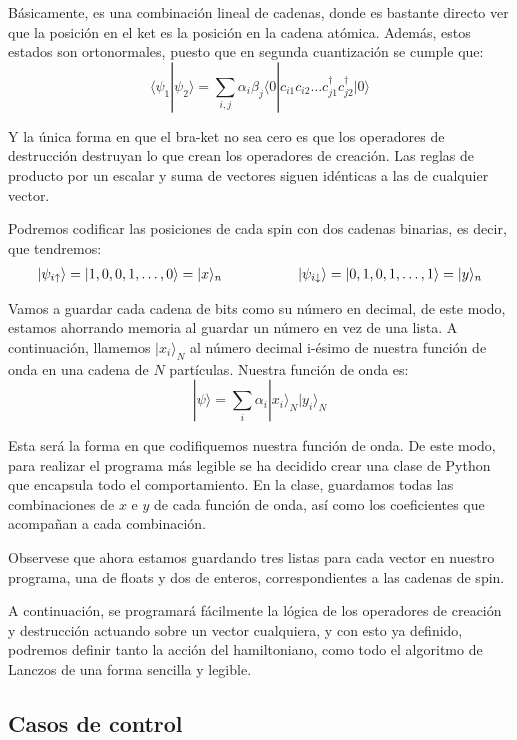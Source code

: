 \documentclass[12pt,twoside]{article}
\begin{document}
Básicamente, es una combinación lineal de cadenas, donde es bastante directo ver que la posición en el ket es la posición en la cadena atómica. Además, estos estados son ortonormales, puesto que en segunda cuantización se cumple que:
$$
\langle\psi_1|\psi_2\rangle = \sum_{i, j}\alpha_i\beta_j\langle 0| c_{i1}c_{i2}\ldots c_{j1}^{\dagger}c_{j2}^{\dagger}|0\rangle
$$

Y la única forma en que el bra-ket no sea cero es que los operadores de destrucción destruyan lo que crean los operadores de creación. Las reglas de producto por un escalar y suma de vectores siguen idénticas a las de cualquier vector.

Podremos codificar las posiciones de cada spin con dos cadenas binarias, es decir, que tendremos:
$$
\begin{array}{ccc}
  |\psi_{i\uparrow}\rangle = |1, 0, 0, 1, \ldots, 0\rangle = |x\rangle_n & \hspace{0.1\linewidth} & |\psi_{i\downarrow}\rangle = |0, 1, 0, 1, \ldots, 1\rangle = |y\rangle_n
\end{array}
$$

Vamos a guardar cada cadena de bits como su número en decimal, de este modo, estamos ahorrando memoria al guardar un número en vez de una lista. A continuación, llamemos $|x_i\rangle_N$ al número decimal i-ésimo de nuestra función de onda en una cadena de $N$ partículas. Nuestra función de onda es:
$$
|\psi\rangle = \sum_i\alpha_i|x_i\rangle_N|y_i\rangle_N
$$

Esta será la forma en que codifiquemos nuestra función de onda. De este modo, para realizar el programa más legible se ha decidido crear una clase de Python que encapsula todo el comportamiento. En la clase, guardamos todas las combinaciones de $x$ e $y$ de cada función de onda, así como los coeficientes que acompañan a cada combinación.

Observese que ahora estamos guardando tres listas para cada vector en nuestro programa, una de floats y dos de enteros, correspondientes a las cadenas de spin.

A continuación, se programará fácilmente la lógica de los operadores de creación y destrucción actuando sobre un vector cualquiera, y con esto ya definido, podremos definir tanto la acción del hamiltoniano, como todo el algoritmo de Lanczos de una forma sencilla y legible.
\subsection{Casos de control}
\end{document}
